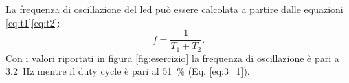 \noindent
La frequenza di oscillazione del led può essere calcolata a partire dalle equazioni \ref{eq:t1}\ref{eq:t2}:
\begin{equation}
	f = \frac{1}{T_1 + T_2}.
\end{equation}
Con i valori riportati in figura \ref{fig:esercizio} la frequenza di oscillazione è pari a \SI{3.2}{\hertz} mentre il duty cycle è pari al \SI{51}{\percent} (Eq. \ref{eq:3_1}).